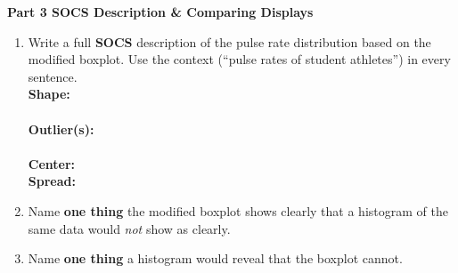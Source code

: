 \documentclass[10pt]{article}
\begin{document}
\vspace{0.12in}

{\large\bfseries\color{navy} Part 3 \quad SOCS Description \& Comparing Displays}

\vspace{0.10in}

\begin{enumerate}[leftmargin=1.5em, itemsep=8pt, resume]

  \item Write a full \textbf{SOCS} description of the pulse rate distribution
        based on the modified boxplot. Use the context (``pulse rates of student
        athletes'') in every sentence.\\[5pt]
        \textbf{Shape:} \writeline\\[1pt]\writeline\\[5pt]
        \textbf{Outlier(s):} \writeline\\[1pt]\writeline\\[5pt]
        \textbf{Center:} \writeline\\[5pt]
        \textbf{Spread:} \writeline

  \item Name \textbf{one thing} the modified boxplot shows clearly that a
        histogram of the same data would \textit{not} show as clearly.\\[5pt]
        \writeline

  \item Name \textbf{one thing} a histogram would reveal that the boxplot
        cannot.\\[5pt]
        \writeline

\end{enumerate}
\end{document}
